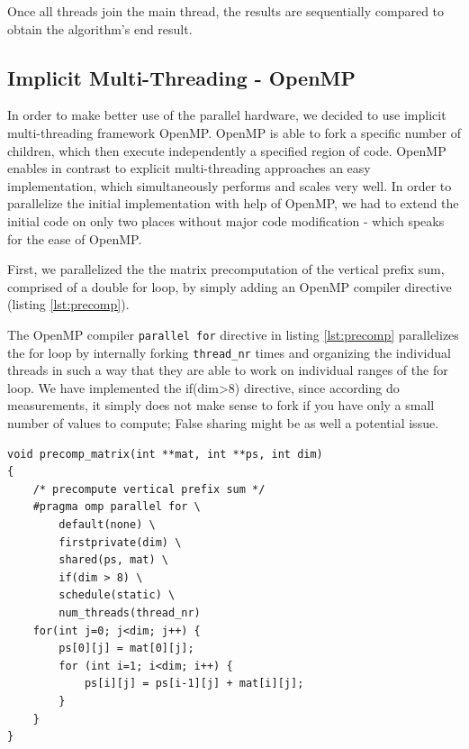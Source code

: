 \documentclass[conference]{IEEEtran}
\begin{document}
Once all threads join the main thread, the results are sequentially compared to obtain the algorithm's end result.

\subsection{Implicit Multi-Threading - OpenMP}
\label{sec:impl:openmp}

In order to make better use of the parallel hardware, we decided to use implicit multi-threading framework OpenMP. OpenMP is able to fork a specific number of children, which then execute independently a specified region of code. OpenMP enables in contrast to explicit multi-threading approaches an easy implementation, which simultaneously performs and scales very well. In order to parallelize the initial implementation with help of OpenMP, we had to extend the initial code on only two places without major code modification - which speaks for the ease of OpenMP. 

First, we parallelized the the matrix precomputation of the vertical prefix sum, comprised of a double for loop, by simply adding an OpenMP compiler directive (listing \ref{lst:precomp}).

The OpenMP compiler \texttt{parallel for} directive in listing \ref{lst:precomp} parallelizes the for loop by internally forking \texttt{thread\_nr} times and organizing the individual threads in such a way that they are able to work on individual ranges of the for loop. We have implemented the if(dim>8) directive, since according do measurements, it simply does not make sense to fork if you have only a small number of values to compute; False sharing might be as well a potential issue. 

\begin{center}
   \begin{lstlisting}[captionpos=b, caption=OpenMP: Parallel Matrix Pre-Computation of the Vertical Sum, label=lst:precomp]                                            
void precomp_matrix(int **mat, int **ps, int dim)                                  
{                                             
    /* precompute vertical prefix sum */  
    #pragma omp parallel for \ 
        default(none) \        
        firstprivate(dim) \    
        shared(ps, mat) \      
        if(dim > 8) \          
        schedule(static) \     
        num_threads(thread_nr)     
    for(int j=0; j<dim; j++) {                
        ps[0][j] = mat[0][j];                 
        for (int i=1; i<dim; i++) {           
            ps[i][j] = ps[i-1][j] + mat[i][j];
        }                                     
    }                                         
}                                             
   \end{lstlisting}
\end{center}
\end{document}
